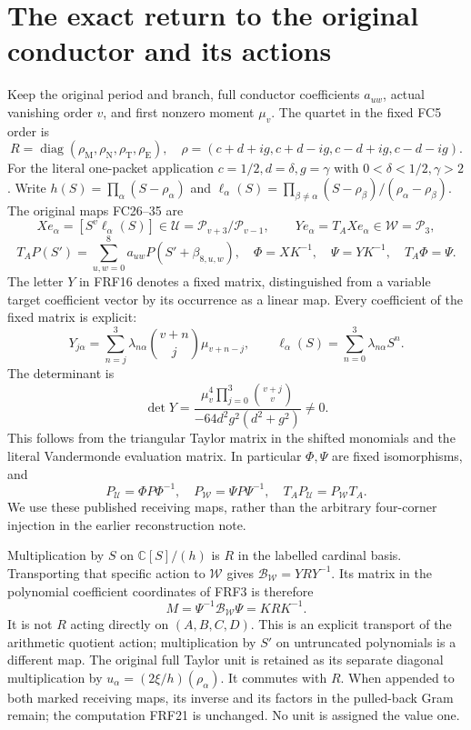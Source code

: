 \documentclass[11pt]{article}
\newcommand{\C}{\mathbb C}
\newcommand{\diag}{\operatorname{diag}}
\begin{document}
\section{The exact return to the original conductor and its actions}
Keep the original period and branch, full conductor coefficients $a_{uw}$,
actual vanishing order $v$, and first nonzero moment $\mu_v$. The quartet
in the fixed FC5 order is
\[
 R=\diag(\rho_{\mathrm M},\rho_{\mathrm N},\rho_{\mathrm T},\rho_{\mathrm E}),
 \quad \rho=(c+d+ig,c+d-ig,c-d+ig,c-d-ig).\tag{FRF15}
\]
For the literal one-packet application $c=1/2,d=\delta,g=\gamma$ with
$0<\delta<1/2,\gamma>2$. Write
$h(S)=\prod_\alpha(S-\rho_\alpha)$ and
$\ell_\alpha(S)=\prod_{\beta\ne\alpha}(S-\rho_\beta)/(\rho_\alpha-\rho_\beta)$.
The original maps FC26--35 are
\[
 Xe_\alpha=[S^v\ell_\alpha(S)]\in
 \mathcal U=\mathcal P_{v+3}/\mathcal P_{v-1},\qquad
 Ye_\alpha=T_A Xe_\alpha\in\mathcal W=\mathcal P_3,\tag{FRF16}
\]
\[
 T_AP(S')=\sum_{u,w=0}^8a_{uw}P(S'+\beta_{8,u,w}),\quad
 \Phi=XK^{-1},\quad\Psi=YK^{-1},\quad T_A\Phi=\Psi.\tag{FRF17}
\]
The letter $Y$ in FRF16 denotes a fixed matrix, distinguished from a
variable target coefficient vector by its occurrence as a linear map.
Every coefficient of the fixed matrix is explicit:
\[
 Y_{j\alpha}=\sum_{n=j}^3\lambda_{n\alpha}
       \binom{v+n}{j}\mu_{v+n-j},\qquad
 \ell_\alpha(S)=\sum_{n=0}^3\lambda_{n\alpha}S^n.\tag{FRF18}
\]
The determinant is
\[
 \det Y=\frac{\mu_v^4\prod_{j=0}^3\binom{v+j}{v}}
 {-64d^2g^2(d^2+g^2)}\ne0.\tag{FRF19}
\]
This follows from the triangular Taylor matrix in the shifted monomials
and the literal Vandermonde evaluation matrix. In particular $\Phi,\Psi$
are fixed isomorphisms, and
\[
 P_{\mathcal U}=\Phi P\Phi^{-1},\quad
 P_{\mathcal W}=\Psi P\Psi^{-1},\quad
 T_AP_{\mathcal U}=P_{\mathcal W}T_A.\tag{FRF20}
\]
We use these published receiving maps, rather than the arbitrary
four-corner injection in the earlier reconstruction note.

Multiplication by $S$ on $\C[S]/(h)$ is $R$ in the labelled cardinal
basis. Transporting that specific action to $\mathcal W$ gives
$\mathcal B_{\mathcal W}=YRY^{-1}$. Its matrix in the polynomial
coefficient coordinates of FRF3 is therefore
\[
 \boxed{M=\Psi^{-1}\mathcal B_{\mathcal W}\Psi=KRK^{-1}.}\tag{FRF21}
\]
It is not $R$ acting directly on $(A,B,C,D)$. This is an explicit transport
of the arithmetic quotient action; multiplication by $S'$ on untruncated
polynomials is a different map. The original full Taylor unit is retained
as its separate diagonal multiplication by $u_\alpha=(2\xi/h)(\rho_\alpha)$.
It commutes with $R$. When appended to both marked receiving maps, its
inverse and its factors in the pulled-back Gram remain; the computation
FRF21 is unchanged. No unit is assigned the value one.
\end{document}
